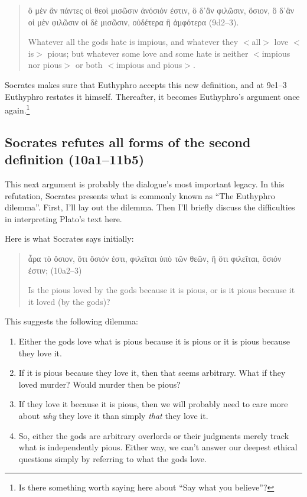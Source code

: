 \documentclass[11pt]{article}
\begin{document}
\begin{quote}

    {\g
    ὃ μὲν ἂν πάντες οἱ θεοὶ μισῶσιν ἀνόσιόν ἐστιν, ὃ δ᾽ἂν φιλῶσιν, ὅσιον, ὃ δ᾽ἂν οἱ μὲν φιλῶσιν οἱ δὲ μισῶσιν, οὐδέτερα ἢ ἀμφότερα
    } (9d2--3).

    Whatever all the gods hate is impious, and whatever they $<$all$>$ love $<$is$>$ pious; but whatever some love and some hate is neither $<$impious nor pious$>$ or both $<$impious and pious$>$.

\end{quote}

Socrates makes sure that Euthyphro accepts this new definition, and at 9e1--3 Euthyphro restates it himself.  Thereafter, it becomes Euthyphro's argument once again.\footnote{Is there something worth saying here about ``Say what you believe''?}


\subsection{Socrates refutes all forms of the second definition (10a1--11b5)}

This next argument is probably the dialogue's most important legacy.  In this refutation, Socrates presents what is commonly known as ``The Euthyphro dilemma''.  First, I'll lay out the dilemma.  Then I'll briefly discuss the difficulties in interpreting Plato's text here.

Here is what Socrates says initially:

\begin{quote}

    {\g
    ἆρα τὸ ὅσιον, ὅτι ὅσιόν ἐστι, φιλεῖται ὑπὸ τῶν θεῶν, ἢ ὅτι φιλεῖται, ὅσιόν ἐστιν;
    } (10a2--3)

    Is the pious loved by the gods because it is pious, or is it pious because it it loved (by the gods)?

\end{quote}

This suggests the following dilemma:

\begin{enumerate}

    \item Either the gods love what is pious because it is pious or it is pious because they love it.

    \item If it is pious because they love it, then that seems arbitrary.  What if they loved murder?  Would murder then be pious?

    \item If they love it because it is pious, then we will probably need to care more about \emph{why} they love it than simply \emph{that} they love it.

    \item So, either the gods are arbitrary overlords or their judgments merely track what is independently pious.  Either way, we can't answer our deepest ethical questions simply by referring to what the gods love.

\end{enumerate}
\end{document}
